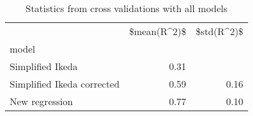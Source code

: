 
\begin{table}[H]
    \centering
    \caption{Statistics from cross validations with all models}
   \begin{tabular}{lrr}
\toprule
{} &  \$mean(R\textasciicircum 2)\$ &  \$std(R\textasciicircum 2)\$ \\
model                      &              &             \\
\midrule
Simplified Ikeda           &         0.31 &             \\
Simplified Ikeda corrected &         0.59 &        0.16 \\
New regression             &         0.77 &        0.10 \\
\bottomrule
\end{tabular}

    \label{tab:crossvalidation}
\end{table}
    